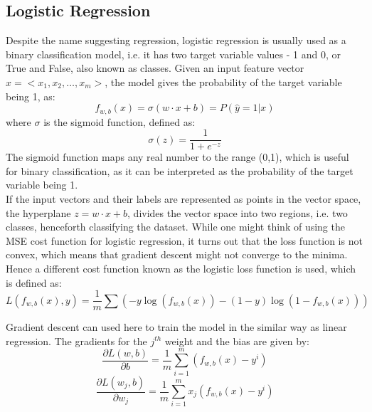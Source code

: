 \documentclass{article}
\begin{document}
\subsection{Logistic Regression}
Despite the name suggesting regression, logistic regression is usually used as a binary classification model, i.e. it has two target variable values - 1 and 0, or True and False, also known as classes. 
Given an input feature vector $x = <x_1,x_2,\dots,x_m>$, the model gives the probability of the target variable being 1, as:
\begin{equation}
    f_{w,b}(x) = \sigma(w \cdot x + b) = P(\hat{y}=1|x)
\end{equation}
where $\sigma$ is the sigmoid function, defined as:
\begin{equation}
    \sigma(z) = \frac{1}{1+e^{-z}}
\end{equation}
The sigmoid function maps any real number to the range (0,1), which is useful for binary classification, as it can be interpreted as the probability of the target variable being 1.\\
\newline
If the input vectors and their labels are represented as points in the vector space, the hyperplane $z = w \cdot x + b$, divides the vector space into two regions, i.e. two classes, henceforth classifying the dataset.
\newline
While one might think of using the MSE cost function for logistic regression, it turns out that the loss function is not convex, which means that gradient descent might not converge to the minima. Hence a different cost function known as the logistic loss function is used, which is defined as:
\begin{equation}
    L(f_{w,b}(x),y) = \frac{1}{m} \sum(-y \log(f_{w,b}(x)) - (1-y) \log(1-f_{w,b}(x)))
\end{equation}

Gradient descent can used here to train the model in the similar way as linear regression.
The gradients for the $j^{th}$ weight and the bias are given by:
\begin{equation}
    \frac{\partial L(w,b)}{\partial b} = \frac{1}{m} \sum_{i=1}^{m} (f_{w,b}(x)-y^i)
\end{equation}
\begin{equation}
    \frac{\partial L(w_j,b)}{\partial w_j} = \frac{1}{m} \sum_{i=1}^{m} x_j(f_{w,b}(x)-y^i)
\end{equation}
\end{document}
